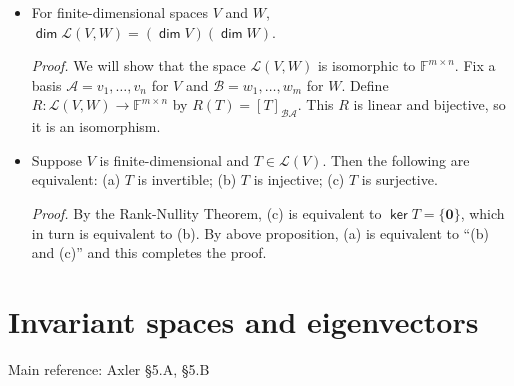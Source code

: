 \documentclass[11pt]{article}
\newcommand{\1}{\mathbf{1}}
\newcommand{\0}{\mathbf{0}}
\newcommand{\A}{\mathcal{A}}
\newcommand{\B}{\mathcal{B}}
\newcommand{\F}{\mathbb{F}}
\newcommand{\cL}{\mathcal{L}}
\DeclareMathOperator{\myker}{\mathsf{ker}}
\DeclareMathOperator{\mydim}{\mathsf{dim}}
\begin{document}
\begin{itemize}
\item

For finite-dimensional spaces $V$ and $W$, $\mydim \cL(V,W) = (\mydim V) (\mydim W)$.

\emph{Proof.}
We will show that the space $\cL(V,W)$ is isomorphic to $\F^{m \times n}$.
Fix a basis $\A = v_1,\dots,v_n$ for $V$ and $\B = w_1,\dots,w_m$ for $W$.
Define $R:\cL(V,W) \to \F^{m \times n}$ by $R(T) = [T]_{\B\A}$.
This $R$ is linear and bijective, so it is an isomorphism.

\item

Suppose $V$ is finite-dimensional and $T \in \cL(V)$.
Then the following are
equivalent:
(a) $T$ is invertible;
(b) $T$ is injective;
(c) $T$ is surjective.

\emph{Proof.}
By the Rank-Nullity Theorem, (c) is equivalent to $\myker T = \{\0\}$, which in turn is equivalent to (b).
By above proposition, (a) is equivalent to ``(b) and (c)'' and this completes the proof.

\end{itemize}




\clearpage
\section{Invariant spaces and eigenvectors}

Main reference:
Axler \S5.A, \S5.B
\end{document}
